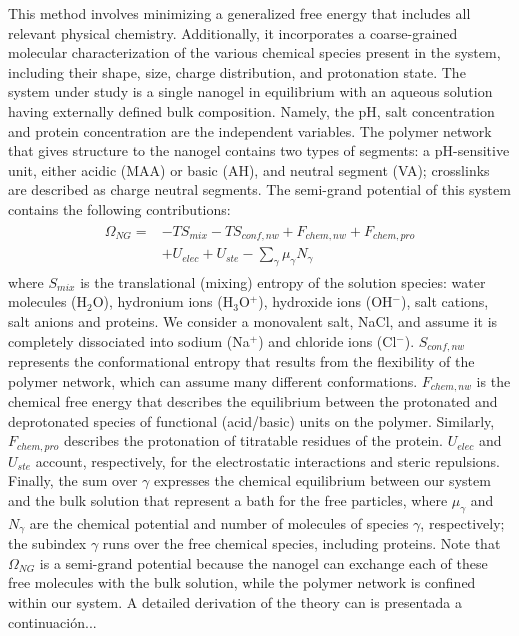 This method involves minimizing a generalized free energy that includes all relevant physical chemistry.
Additionally, it incorporates a coarse-grained molecular characterization of the various chemical species present in the system, including their shape, size, charge distribution, and protonation state.
The system under study is a single nanogel in equilibrium with an aqueous solution having externally defined bulk composition.
Namely, the pH, salt concentration and protein concentration are the independent variables.
The polymer network that gives structure to the nanogel  contains two types of segments: a pH-sensitive unit, either acidic (MAA) or basic (AH), and neutral segment (VA); 
crosslinks are described as charge neutral segments.
The semi-grand potential of this system contains the following contributions:
\begin{align}
\begin{aligned}
\Omega_{NG}=& -TS_{mix} -TS_{conf,nw} + F_{chem,nw} + F_{chem,pro}\\
& + U_{elec} + U_{ste}  - {\sum_{\gamma}{\mu_\gamma N_\gamma}}
\end{aligned}
\label{eq:esf:semicano}
\end{align}
\noindent where $S_{mix}$ is the translational (mixing) entropy of the solution species: water molecules (H$_2$O), hydronium ions (H$_3$O$^+$), hydroxide ions (OH$^-$), salt cations, salt anions and proteins.
We consider a monovalent salt, NaCl, and assume it is completely dissociated into sodium (Na$^+$) and chloride ions (Cl$^-$).
$S_{conf,nw}$ represents the conformational entropy that results from the flexibility of the polymer network, which can assume many different conformations. 
$F_{chem,nw}$ is the chemical free energy that describes the equilibrium between the protonated and deprotonated species of functional (acid/basic) units on the polymer. 
Similarly, $F_{chem,pro}$ describes the protonation of titratable residues of the protein.
$U_{elec}$ and $U_{ste}$ account, respectively, for the electrostatic interactions and steric repulsions.
Finally, the sum over $\gamma$ expresses the chemical equilibrium between our system and the bulk solution that represent a bath for the free particles, where $\mu_\gamma$ and $N_\gamma$ are the chemical potential and number of molecules of species $\gamma$, respectively;
the subindex $\gamma$ runs over the free chemical species, including proteins.
Note that $\Omega_{NG}$ is a semi-grand potential because the nanogel  can exchange each of these free molecules with the bulk solution, while the polymer network is confined within our system.
A detailed derivation of the theory can is presentada a continuaci\'on...


